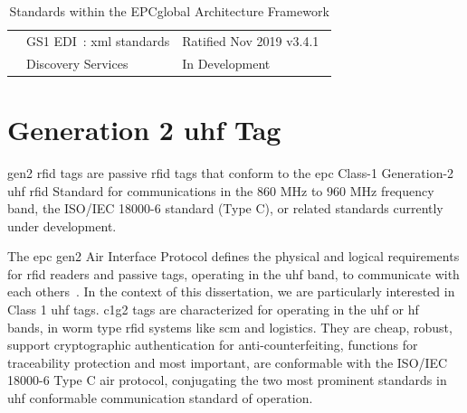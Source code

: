 \begin{table}[]
\begin{adjustwidth}{-0.09\textwidth}{0em}
\begin{tabular}{|l|l|l|}
                                                                                            & GS1 EDI~\cite{anonymousGS1ElectronicData2014}: \acs{xml} standards                                                   & Ratified Nov 2019 v3.4.1~\cite{david.buckleyGS1XMLStandards2019}                                                                                                                                         \\ \cline{2-3} 
                                                                                            & Discovery Services                                                                                                                                          & In Development                                                                                                                                                                                                                 \\ \hline
    \end{tabular}
    \end{adjustwidth}
    \caption{Standards within the EPCglobal Architecture Framework} 
    \label{tab:standards}
\end{table}

\section{Generation 2 \ac{uhf} Tag}

\ac{gen2} \ac{rfid} tags are passive \ac{rfid} tags that conform to the \ac{epc} Class-1 Generation-2 \ac{uhf} \ac{rfid} Standard for communications in the $860$ MHz to $960$ MHz frequency band, the ISO/IEC 18000-6 standard (Type C), or related standards currently under development.

The \ac{epc} \acl{gen2} Air Interface Protocol defines the physical and logical requirements for \ac{rfid} readers and passive tags, operating in the \ac{uhf} band, to communicate with each others~\cite{UHFGen2Tag}.
In the context of this dissertation, we are particularly interested in Class 1 \ac{uhf} tags. \ac{c1g2} tags are characterized for operating in the \ac{uhf} or \ac{hf}~\cite{HFClassTag} bands, in \ac{worm} type \ac{rfid} systems like \ac{scm} and logistics.
They are cheap, robust, support cryptographic authentication for anti-counterfeiting, functions for traceability protection and most important, are conformable with the ISO/IEC 18000-6 Type C air protocol, conjugating the two most prominent standards in \ac{uhf} conformable communication standard of operation.

